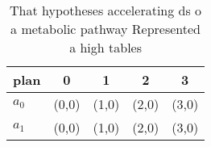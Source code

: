 \documentclass[a4paper]{article}
\begin{document}
\begin{table}
\begin{adjustbox}{width=0.5\columnwidth}
\begin{tabular}{|l|l|l|l|l|}
\hline
\textbf{plan} & \multicolumn{1}{c|}{\textbf{0}} & \multicolumn{1}{c|}{\textbf{1}} & \multicolumn{1}{c|}{\textbf{2}} & \multicolumn{1}{c|}{\textbf{3}} \\ \hline
\textbf{$a_0$}  & (0,0) & (1,0) & (2,0) & (3,0) \\ \hline
\textbf{$a_1$}  & (0,0) & (1,0) & (2,0) & (3,0) \\ \hline
\end{tabular}
\end{adjustbox}
\caption{That hypotheses accelerating ds o a metabolic pathway Represented a high tables
}
\end{table}
\end{document}
